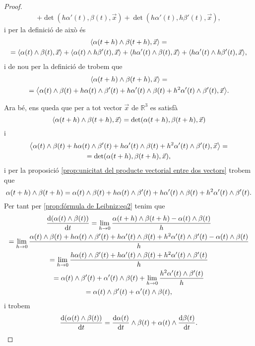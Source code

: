 \documentclass[../Apunts.tex]{subfiles}
\begin{document}
\begin{proposition}
\begin{proof}
\begin{multline*}
				+\det(h\alpha'(t),\beta(t),\vec{x})+\det(h\alpha'(t),h\beta'(t),\vec{x}),
			\end{multline*}
			i per la definició de  això és
			\begin{multline*}
				\prodesc{\alpha(t+h)\prodvec\beta(t+h)}{\vec{x}}=\\
				=\prodesc{\alpha(t)\prodvec\beta(t)}{\vec{x}}+\prodesc{\alpha(t)\prodvec h\beta'(t)}{\vec{x}}+\prodesc{h\alpha'(t)\prodvec\beta(t)}{\vec{x}}+\prodesc{h\alpha'(t)\prodvec h\beta'(t)}{\vec{x}},
			\end{multline*}
			i de nou per la definició de  trobem que
			\begin{multline*}
				\prodesc{\alpha(t+h)\prodvec\beta(t+h)}{\vec{x}}=\\
				=\prodesc{\alpha(t)\prodvec\beta(t)+h\alpha(t)\prodvec\beta'(t)+h\alpha'(t)\prodvec\beta(t)+h^{2}\alpha'(t)\prodvec \beta'(t)}{\vec{x}}.
			\end{multline*}
			
			Ara bé, ens queda que per a tot vector \(\vec{x}\) de \(\mathbb{R}^{3}\) es satisfà
			\[\prodesc{\alpha(t+h)\prodvec\beta(t+h)}{\vec{x}}=\det(\alpha(t+h),\beta(t+h),\vec{x})\]
			i
			\begin{multline*}
				\prodesc{\alpha(t)\prodvec\beta(t)+h\alpha(t)\prodvec\beta'(t)+h\alpha'(t)\prodvec\beta(t)+h^{2}\alpha'(t)\prodvec \beta'(t)}{\vec{x}}=\\=\det(\alpha(t+h),\beta(t+h),\vec{x}),
			\end{multline*}
			i per la proposició \ref{prop:unicitat del producte vectorial entre dos vectors} trobem que
			\[\alpha(t+h)\mathbin{\wedge}\beta(t+h)=\alpha(t)\mathbin{\wedge}\beta(t)+h\alpha(t)\mathbin{\wedge}\beta'(t)+h\alpha'(t)\mathbin{\wedge}\beta(t)+h^{2}\alpha'(t)\mathbin{\wedge} \beta'(t).\]
			Per tant per \eqref{prop:fórmula de Leibniz:eq2} tenim que
			\begin{multline*}
				\frac{\mathrm{d}(\alpha(t)\mathbin{\wedge}\beta(t))}{\mathrm{d} t}=\lim_{h\to0}\frac{\alpha(t+h)\mathbin{\wedge}\beta(t+h)-\alpha(t)\mathbin{\wedge}\beta(t)}{h}\\
				=\lim_{h\to0}\frac{\alpha(t)\mathbin{\wedge}\beta(t)+h\alpha(t)\mathbin{\wedge}\beta'(t)+h\alpha'(t)\mathbin{\wedge}\beta(t)+h^{2}\alpha'(t)\mathbin{\wedge} \beta'(t)-\alpha(t)\mathbin{\wedge}\beta(t)}{h} \\
				=\lim_{h\to0}\frac{h\alpha(t)\mathbin{\wedge}\beta'(t)+h\alpha'(t)\mathbin{\wedge}\beta(t)+h^{2}\alpha'(t)\mathbin{\wedge} \beta'(t)}{h}\\
				=\alpha(t)\mathbin{\wedge}\beta'(t)+\alpha'(t)\mathbin{\wedge}\beta(t)+\lim_{h\to0}\frac{h^{2}\alpha'(t)\mathbin{\wedge} \beta'(t)}{h}\\
				=\alpha(t)\mathbin{\wedge}\beta'(t)+\alpha'(t)\mathbin{\wedge}\beta(t),
			\end{multline*}
			i trobem
			\[\frac{\mathrm{d}(\alpha(t)\mathbin{\wedge}\beta(t))}{\mathrm{d} t}=\frac{\mathrm{d}\alpha(t)}{\mathrm{d} t}\mathbin{\wedge}\beta(t)+\alpha(t)\mathbin{\wedge}\frac{\mathrm{d}\beta(t)}{\mathrm{d} t}.\qedhere\]
		\end{proof}
	\end{proposition}
\end{document}
